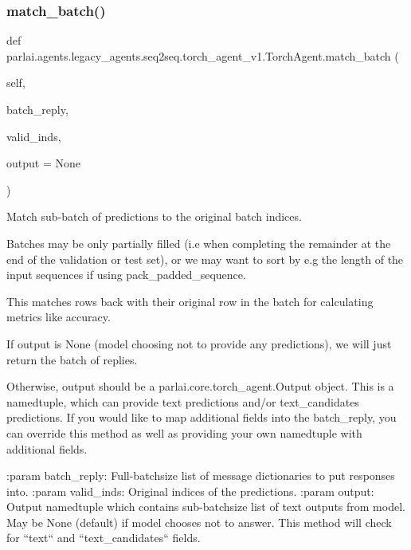 \subsubsection{\texorpdfstring{match\+\_\+batch()}{match\_batch()}}
{\footnotesize\ttfamily def parlai.\+agents.\+legacy\+\_\+agents.\+seq2seq.\+torch\+\_\+agent\+\_\+v1.\+Torch\+Agent.\+match\+\_\+batch (\begin{DoxyParamCaption}\item[{}]{self,  }\item[{}]{batch\+\_\+reply,  }\item[{}]{valid\+\_\+inds,  }\item[{}]{output = {\ttfamily None} }\end{DoxyParamCaption})}

\begin{DoxyVerb}Match sub-batch of predictions to the original batch indices.

Batches may be only partially filled (i.e when completing the remainder
at the end of the validation or test set), or we may want to sort by
e.g the length of the input sequences if using pack_padded_sequence.

This matches rows back with their original row in the batch for
calculating metrics like accuracy.

If output is None (model choosing not to provide any predictions), we
will just return the batch of replies.

Otherwise, output should be a parlai.core.torch_agent.Output object.
This is a namedtuple, which can provide text predictions and/or
text_candidates predictions. If you would like to map additional
fields into the batch_reply, you can override this method as well as
providing your own namedtuple with additional fields.

:param batch_reply: Full-batchsize list of message dictionaries to put
    responses into.
:param valid_inds: Original indices of the predictions.
:param output: Output namedtuple which contains sub-batchsize list of
    text outputs from model. May be None (default) if model chooses not
    to answer. This method will check for ``text`` and
    ``text_candidates`` fields.
\end{DoxyVerb}
 \mbox{\label{classparlai_1_1agents_1_1legacy__agents_1_1seq2seq_1_1torch__agent__v1_1_1TorchAgent_a0eb23a78aea413ae4f90ce0628179920}} 

